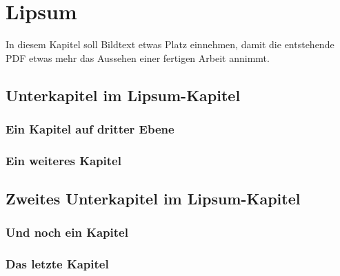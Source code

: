 \section{Lipsum}\label{lipsum}

In diesem Kapitel soll Bildtext etwas Platz einnehmen,
damit die entstehende PDF etwas mehr das Aussehen 
einer fertigen Arbeit annimmt.

\subsection{Unterkapitel im Lipsum-Kapitel}
  \lipsum[1-2]
  \subsubsection{Ein Kapitel auf dritter Ebene}
    \lipsum[3-5]
  \subsubsection{Ein weiteres Kapitel}
    \lipsum[4-6]

\subsection{Zweites Unterkapitel im Lipsum-Kapitel}
  \lipsum[7-8]
  \subsubsection{Und noch ein Kapitel}
    \lipsum[9-10]
  \subsubsection{Das letzte Kapitel}
    \lipsum[11]
